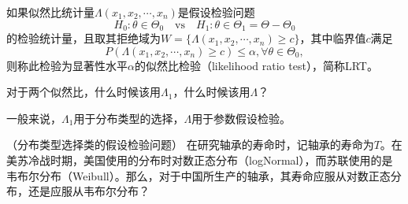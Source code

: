 \begin{definition}[似然比检验]
如果似然比统计量$\Lambda(x_1,x_2,\cdots,x_n)$是假设检验问题
$$
    H_0: \theta \in \Theta_0  \quad \text{vs} \quad H_1: \theta \in \Theta_1 = \Theta- \Theta_0
    $$
的检验统计量，且取其拒绝域为$W = \{\Lambda(x_1,x_2,\cdots,x_n)\geq c\}$，其中临界值$c$满足
$$
P(\Lambda(x_1,x_2,\cdots,x_n)\geq c)\leq \alpha, \forall \theta \in \Theta_0,
$$
则称此检验为显著性水平$\alpha$的似然比检验（likelihood ratio test），简称LRT。
\end{definition}

\begin{problem}
    对于两个似然比，什么时候该用$\Lambda_1$，什么时候该用$\Lambda$？
\end{problem}
\begin{solution}
    一般来说，$\Lambda_1$用于分布类型的选择，$\Lambda$用于参数假设检验。
\end{solution}
\begin{example}{（分布类型选择类的假设检验问题）}
    在研究轴承的寿命时，记轴承的寿命为$T$。在美苏冷战时期，美国使用的分布时对数正态分布（logNormal），而苏联使用的是韦布尔分布（Weibull）。那么，对于中国所生产的轴承，其寿命应服从对数正态分布，还是应服从韦布尔分布？
\end{example}



